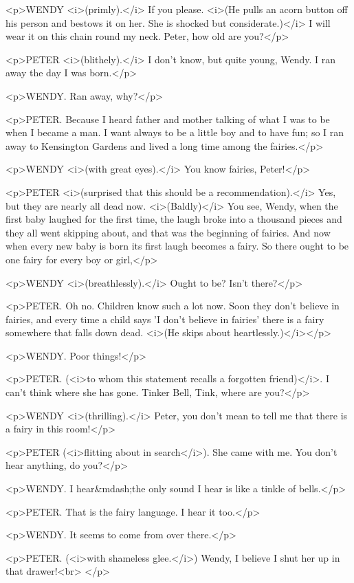 <p>WENDY <i>(primly).</i> If you please. <i>(He pulls an acorn button
off his person and bestows it on her. She is shocked but
considerate.)</i> I will wear it on this chain round my neck. Peter,
how old are you?</p>

<p>PETER <i>(blithely).</i> I don't know, but quite young, Wendy. I
ran away the day I was born.</p>

<p>WENDY. Ran away, why?</p>

<p>PETER. Because I heard father and mother talking of what I was to
be when I became a man. I want always to be a little boy and to have
fun; so I ran away to Kensington Gardens and lived a long time among
the fairies.</p>

<p>WENDY <i>(with great eyes).</i> You know fairies, Peter!</p>

<p>PETER <i>(surprised that this should be a recommendation).</i>
Yes, but they are nearly all dead now. <i>(Baldly)</i> You see,
Wendy, when the first baby laughed for the first time, the laugh
broke into a thousand pieces and they all went skipping about, and
that was the beginning of fairies. And now when every new baby is
born its first laugh becomes a fairy. So there ought to be one fairy
for every boy or girl,</p>

<p>WENDY <i>(breathlessly).</i> Ought to be? Isn't there?</p>

<p>PETER. Oh no. Children know such a lot now. Soon they don't
believe in fairies, and every time a child says 'I don't believe in
fairies' there is a fairy somewhere that falls down dead. <i>(He
skips about heartlessly.)</i></p>

<p>WENDY. Poor things!</p>

<p>PETER. (<i>to whom this statement recalls a forgotten friend)</i>.
I can't think where she has gone. Tinker Bell, Tink, where are
you?</p>

<p>WENDY <i>(thrilling).</i> Peter, you don't mean to tell me that
there is a fairy in this room!</p>

<p>PETER (<i>flitting about in search</i>). She came with me. You
don't hear anything, do you?</p>

<p>WENDY. I hear&mdash;the only sound I hear is like a tinkle of
bells.</p>

<p>PETER. That is the fairy language. I hear it too.</p>

<p>WENDY. It seems to come from over there.</p>

<p>PETER. (<i>with shameless glee.</i>) Wendy, I believe I shut her
up in that drawer!<br>
</p>

